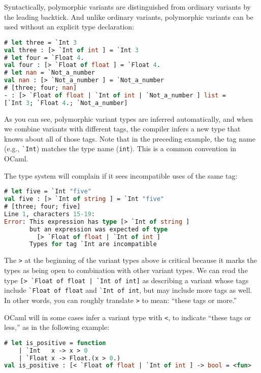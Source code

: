 Syntactically, polymorphic variants are distinguished from ordinary
variants by the leading backtick. And unlike ordinary variants,
polymorphic variants can be used without an explicit type declaration:

\begin{lstlisting}[language=Caml]
# let three = `Int 3
val three : [> `Int of int ] = `Int 3
# let four = `Float 4.
val four : [> `Float of float ] = `Float 4.
# let nan = `Not_a_number
val nan : [> `Not_a_number ] = `Not_a_number
# [three; four; nan]
- : [> `Float of float | `Int of int | `Not_a_number ] list =
[`Int 3; `Float 4.; `Not_a_number]
\end{lstlisting}

As you can see, polymorphic variant types are inferred automatically,
and when we combine variants with different tags, the compiler infers a
new type that knows about all of those tags. Note that in the preceding
example, the tag name (e.g., \passthrough{\lstinline!`Int!}) matches the
type name (\passthrough{\lstinline!int!}). This is a common convention
in OCaml. 

The type system will complain if it sees incompatible uses of the same
tag:

\begin{lstlisting}[language=Caml]
# let five = `Int "five"
val five : [> `Int of string ] = `Int "five"
# [three; four; five]
Line 1, characters 15-19:
Error: This expression has type [> `Int of string ]
       but an expression was expected of type
         [> `Float of float | `Int of int ]
       Types for tag `Int are incompatible
\end{lstlisting}

The \passthrough{\lstinline!>!} at the beginning of the variant types
above is critical because it marks the types as being open to
combination with other variant types. We can read the type
\passthrough{\lstinline![> `Float of float | `Int of int]!} as
describing a variant whose tags include
\passthrough{\lstinline!`Float of float!} and
\passthrough{\lstinline!`Int of int!}, but may include more tags as
well. In other words, you can roughly translate
\passthrough{\lstinline!>!} to mean: ``these tags or more.''

OCaml will in some cases infer a variant type with
\passthrough{\lstinline!<!}, to indicate ``these tags or less,'' as in
the following example:

\begin{lstlisting}[language=Caml]
# let is_positive = function
    | `Int   x -> x > 0
    | `Float x -> Float.(x > 0.)
val is_positive : [< `Float of float | `Int of int ] -> bool = <fun>
\end{lstlisting}

